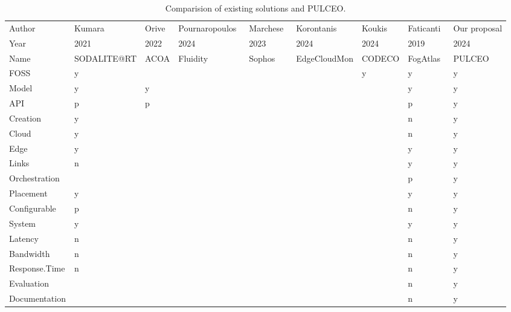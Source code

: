 \begin{table*}[b]

\caption{\label{tab:comparison-of-existing-solutions-and-pulceo}Comparision of existing solutions and PULCEO.}
\centering
\begin{tabu} to 
\toprule
Author & Kumara~\cite{kumaraSODALITERTOrchestrating2021} & Orive~\cite{oriveQualityServiceAware2022} & Pournaropoulos~\cite{pournaropoulosFluidityProvidingFlexible2024} & Marchese~\cite{marcheseSophosFrameworkApplication2023} & Korontanis~\cite{korontanisEdgeCloudMonLightweight2024} & Koukis~\cite{koukisOpenSourceExperimentationFramework2024} & Faticanti~\cite{faticantiCuttingThroughputEdge2019} & Our proposal\\
Year & 2021 & 2022 & 2024 & 2023 & 2024 & 2024 & 2019 & 2024\\
Name & SODALITE@RT & ACOA & Fluidity & Sophos & EdgeCloudMon & CODECO & FogAtlas & PULCEO\\
FOSS & y &  &  &  &  & y & y & y\\
Model & y & y &  &  &  &  & y & y\\
API & p & p &  &  &  &  & p & y\\
Creation & y &  &  &  &  &  & n & y\\
Cloud & y &  &  &  &  &  & n & y\\
Edge & y &  &  &  &  &  & y & y\\
Links & n &  &  &  &  &  & y & y\\
Orchestration &  &  &  &  &  &  & p & y\\
Placement & y &  &  &  &  &  & y & y\\
Configurable & p &  &  &  &  &  & n & y\\
System & y &  &  &  &  &  & y & y\\
Latency & n &  &  &  &  &  & n & y\\
Bandwidth & n &  &  &  &  &  & n & y\\
Response.Time & n &  &  &  &  &  & n & y\\
Evaluation &  &  &  &  &  &  & n & y\\
Documentation &  &  &  &  &  &  & n & y\\
\bottomrule
\end{tabu}
\end{table*}
